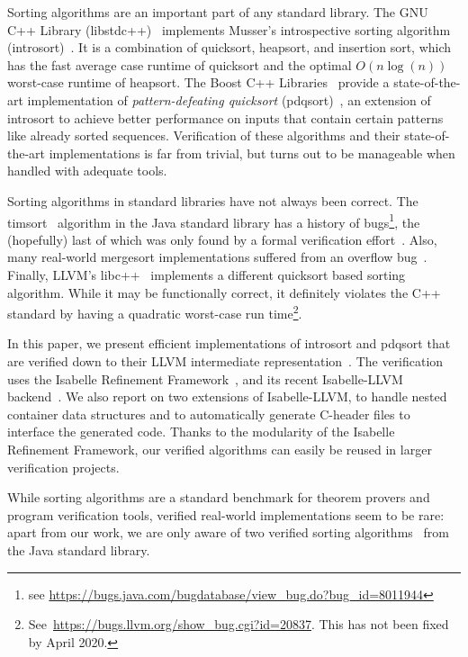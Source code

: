 \documentclass[runningheads]{llncs}
\begin{document}
  Sorting algorithms are an important part of any standard library.
  The GNU C++ Library (libstdc++)~\cite{libstdc++} implements Musser's introspective sorting algorithm (introsort)~\cite{Muss97}.
  It is a combination of quicksort, heapsort, and insertion sort,
  which has the fast average case runtime of quicksort and the optimal $O(n\log(n))$
  worst-case runtime of heapsort.
  The Boost C++ Libraries~\cite{boost} provide a state-of-the-art implementation of
  \emph{pattern-defeating quicksort} (pdqsort)~\cite{pdqsort}, an extension of introsort to
  achieve better performance on inputs that contain certain patterns like already sorted sequences.
  Verification of these algorithms and their state-of-the-art implementations is far from trivial,
  but turns out to be manageable when handled with adequate tools.

  Sorting algorithms in standard libraries have not always been correct.
  The timsort~\cite{Peters02} algorithm in the Java standard library has a history of bugs\footnote{see \url{https://bugs.java.com/bugdatabase/view_bug.do?bug_id=8011944}}, the (hopefully) last of which was only found by a formal verification effort~\cite{GRBBH15}.
  Also, many real-world mergesort implementations suffered from an overflow bug~\cite{bs_flaw_blogpost}.
  Finally, LLVM's libc++~\cite{libc++} implements a different quicksort based sorting algorithm. While it may be functionally correct,
  it definitely violates the C++ standard by having a quadratic worst-case run time\footnote{See~\url{https://bugs.llvm.org/show_bug.cgi?id=20837}. This has not been fixed by April 2020.}.

  In this paper, we present efficient implementations of introsort and pdqsort that are verified down to their
  LLVM intermediate representation~\cite{LLVM-manual}. The verification uses the
  Isabelle Refinement Framework~\cite{LaTu12}, and its recent Isabelle-LLVM backend~\cite{La19-llvm}.
  We also report on two extensions of Isabelle-LLVM, to handle nested container data structures and to automatically
  generate C-header files to interface the generated code. Thanks to the modularity of the Isabelle Refinement Framework,
  our verified algorithms can easily be reused in larger verification projects.

  While sorting algorithms are a standard benchmark for theorem provers and program verification tools,
  verified real-world implementations seem to be rare: apart from our work, we are only aware of
  two verified sorting algorithms~\cite{GRBBH15,BSSU17} from the Java standard library.
\end{document}
